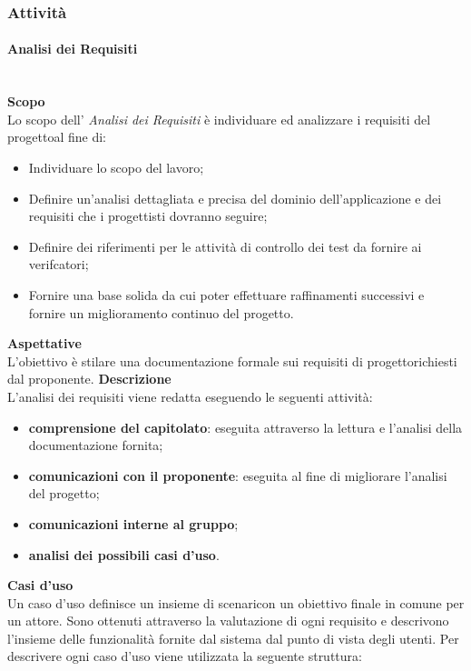\subsubsection{Attività}
\paragraph{Analisi dei Requisiti}\mbox{}\\ [1mm]
\textbf{Scopo}\\ 
Lo scopo dell' \textit{Analisi dei Requisiti} è individuare ed analizzare i requisiti del progetto\glosp al fine di:
\begin{itemize}
	\item Individuare lo scopo del lavoro;
	\item Definire un'analisi dettagliata e precisa del dominio dell'applicazione e dei requisiti che i progettisti dovranno seguire;
	\item Definire dei riferimenti per le attività di controllo dei test da fornire ai verifcatori;
	\item Fornire una base solida da cui poter effettuare raffinamenti successivi e fornire un miglioramento continuo del progetto\glo.
\end{itemize}
\textbf{Aspettative}\\
L'obiettivo è stilare una documentazione formale sui requisiti di progetto\glosp richiesti dal proponente.
\textbf{Descrizione}\\
L'analisi dei requisiti viene redatta eseguendo le seguenti attività:
\begin{itemize}
	\item \textbf{comprensione del capitolato}\glo: eseguita attraverso la lettura e l'analisi della documentazione fornita;
	\item \textbf{comunicazioni con il proponente}: eseguita al fine di migliorare l'analisi del progetto;
	\item \textbf{comunicazioni interne al gruppo};
	\item \textbf{analisi dei possibili casi d'uso}.
\end{itemize}
\textbf{Casi d'uso}\\
Un caso d'uso definisce un insieme di scenari\glosp con un obiettivo finale in comune per un attore. Sono ottenuti attraverso la valutazione di ogni requisito e descrivono l'insieme delle funzionalità fornite dal sistema dal punto di vista degli utenti.
Per descrivere ogni caso d'uso viene utilizzata la seguente struttura:
